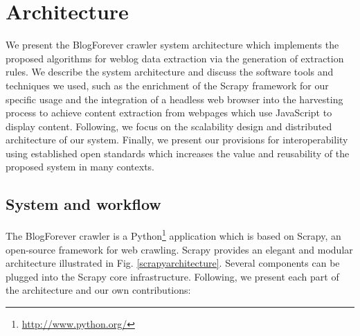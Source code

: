 ﻿\section{Architecture}
\label{architecture}

We present the BlogForever crawler system architecture which implements 
the proposed algorithms for weblog data extraction via the generation 
of extraction rules. We describe the system architecture and discuss 
the software tools and techniques we used, such as the enrichment of the 
Scrapy framework for our specific usage and the integration of a headless 
web browser into the harvesting process to achieve content extraction 
from webpages which use JavaScript to display content. Following, 
we focus on the scalability design and distributed architecture of our 
system. Finally, we present our provisions for interoperability using 
established open standards which increases the value and reusability 
of the proposed system in many contexts. 

\subsection{System and workflow}

The BlogForever crawler is a Python\footnote{\label{python}\url{http://www.python.org/}} 
application which is based on  Scrapy, an open-source framework for web crawling. 
Scrapy provides an elegant and modular architecture illustrated 
in Fig. \ref{scrapyarchitecture}. Several components can be plugged into 
the Scrapy core infrastructure. Following, we present each part of the 
architecture and our own contributions:

